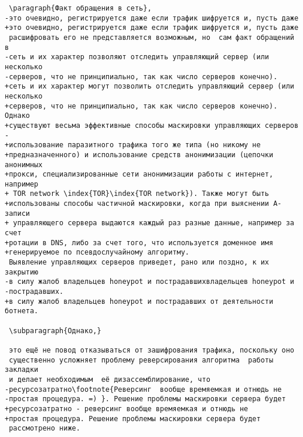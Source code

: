 \begin{verbatim}
 \paragraph{Факт обращения в сеть},
-это очевидно, регистрируется даже если трафик шифруется и, пусть даже
+это очевидно, регистрируется даже если трафик шифруется и, пусть даже
 расшифровать его не представляется возможным, но  сам факт обращений в
-сеть и их характер позволяют отследить управляющий сервер (или несколько
-серверов, что не принципиально, так как число серверов конечно).
+сеть и их характер могут позволить отследить управляющий сервер (или несколько
+серверов, что не принципиально, так как число серверов конечно). Однако
+существуют весьма эффективные способы маскировки управляющих серверов -
+использование паразитного трафика того же типа (но никому не
+предназначенного) и использование средств анонимизации (цепочки анонимных
+прокси, специализированные сети анонимизации работы с интернет, например
+ TOR network \index{TOR}\index{TOR network}). Также могут быть
+использованы способы частичной маскировки, когда при выяснении A-записи
+ управляющего сервера выдаются каждый раз разные данные, например за счет
+ротации в DNS, либо за счет того, что используется доменное имя
+генерируемое по псевдослучайному алгоритму.
 Выявление управляющих серверов приведет, рано или поздно, к их закрытию
-в силу жалоб владельцев honeypot и пострадавшихвладельцев honeypot и
-пострадавших.
+в силу жалоб владельцев honeypot и пострадавших от деятельности ботнета.

 \subparagraph{Однако,}

 это ещё не повод отказываться от зашифрования трафика, поскольку оно
 существенно усложняет проблему реверсирования алгоритма  работы закладки
 и делает необходимым  её дизассемблирование, что
-ресурсозатратно\footnote{Реверсинг  вообще времяемкая и отнюдь не
-простая процедура. =) }. Решение проблемы маскировки сервера будет
+ресурсозатратно - реверсинг вообще времяемкая и отнюдь не
+простая процедура. Решение проблемы маскировки сервера будет
 рассмотрено ниже.


\end{verbatim}
